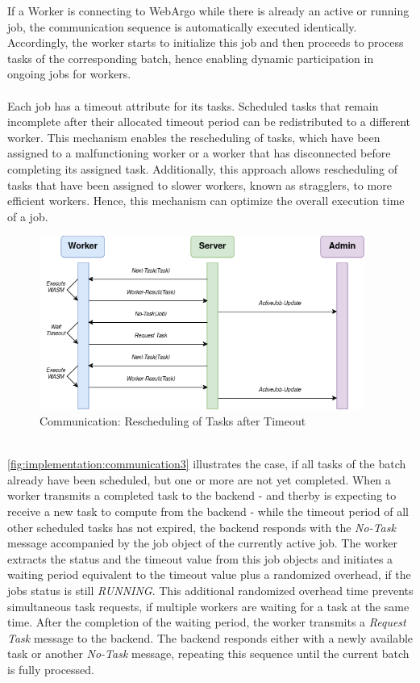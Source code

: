 If a Worker is connecting to WebArgo while there is already an active or running job, the communication sequence is automatically executed identically. Accordingly, the worker starts to initialize this job and then proceeds to process tasks of the corresponding batch, hence enabling dynamic participation in ongoing jobs for workers.
\\~\\
Each job has a timeout attribute for its tasks. Scheduled tasks that remain incomplete after their allocated timeout period can be redistributed to a different worker. This mechanism enables the rescheduling of tasks, which have been assigned to a malfunctioning worker or a worker that has disconnected before completing its assigned task. Additionally, this approach allows rescheduling of tasks that have been assigned to slower workers, known as stragglers, to more efficient workers. Hence, this mechanism can optimize the overall execution time of a job.
\begin{figure}[htbp]
    \centering
    \includegraphics[width=0.95\textwidth]{gfx/figures/communication-timeout.png}
    \caption{Communication: Rescheduling of Tasks after Timeout}
    \label{fig:implementation:communication3}
\end{figure}
~\\
\autoref{fig:implementation:communication3} illustrates the case, if all tasks of the batch already have been scheduled, but one or more are not yet completed. When a worker transmits a completed task to the backend - and therby is expecting to receive a new task to compute from the backend - while the timeout period of all other scheduled tasks has not expired, the backend responds with the \emph{No-Task} message accompanied by the job object of the currently active job. The worker extracts the status and the timeout value from this job objects and initiates a waiting period equivalent to the timeout value plus a randomized overhead, if the jobs status is still \emph{RUNNING}. This additional randomized overhead time prevents simultaneous task requests, if multiple workers are waiting for a task at the same time. After the completion of the waiting period, the worker transmits a \emph{Request Task} message to the backend. The backend responds either with a newly available task or another \emph{No-Task} message, repeating this sequence until the current batch is fully processed.

